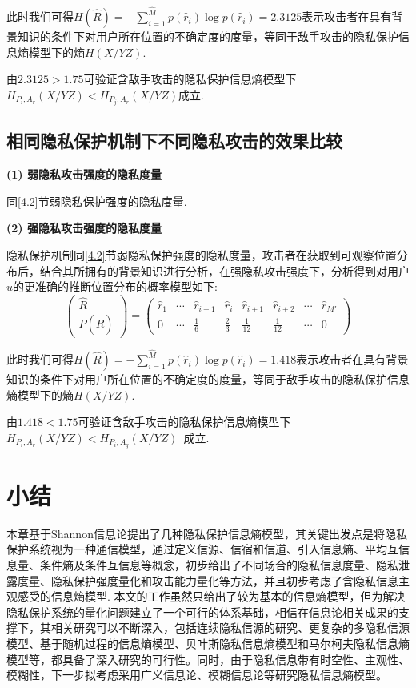 此时我们可得$H(\hat{R})=-\sum_{i=1}^{\hat{M}}p(\hat{r}_{i})\log p(\hat{r}_{i})=2.3125$表示攻击者在具有背景知识的条件下对用户所在位置的不确定度的度量，等同于敌手攻击的隐私保护信息熵模型下的熵$H(X/YZ)$.

由$2.3125>1.75$可验证含敌手攻击的隐私保护信息熵模型下$H_{P_{i},A_{r}}(X/YZ)<H_{P_{j},A_{r}}(X/YZ)$成立.

\subsection{相同隐私保护机制下不同隐私攻击的效果比较}

\textbf{(1) 弱隐私攻击强度的隐私度量}

同\ref{4.2}节弱隐私保护强度的隐私度量.

\textbf{(2) 强隐私攻击强度的隐私度量}

隐私保护机制同\ref{4.2}节弱隐私保护强度的隐私度量，攻击者在获取到可观察位置分布后，结合其所拥有的背景知识进行分析，在强隐私攻击强度下，分析得到对用户$u$的更准确的推断位置分布的概率模型如下:
\begin{equation*}
\begin{pmatrix}
\hat{R}\\ 
P(\hat{R})
\end{pmatrix}=\begin{pmatrix}
\hat{r}_{1} & \cdots & \hat{r}_{i-1}  & \hat{r}_{i} & \hat{r}_{i+1} & \hat{r}_{i+2} & \cdots  & \hat{r}_{{M}'}\\ 
0 & \cdots  & \frac{1}{6} & \frac{2}{3} & \frac{1}{12} & \frac{1}{12} & \cdots  & 0
\end{pmatrix}
\end{equation*}

此时我们可得$H(\hat{R})=-\sum_{i=1}^{\hat{M}}p(\hat{r}_{i})\log p(\hat{r}_{i})=1.418$表示攻击者在具有背景知识的条件下对用户所在位置的不确定度的度量，等同于敌手攻击的隐私保护信息熵模型下的熵$H(X/YZ)$.

由$1.418<1.75$可验证含敌手攻击的隐私保护信息熵模型下~$H_{P_{i},A_{r}}(X/YZ)<H_{P_{i},A_{q}}(X/YZ)$~成立.

\section{小结}\label{conclusion}
本章基于Shannon信息论提出了几种隐私保护信息熵模型，其关键出发点是将隐私保护系统视为一种通信模型，通过定义信源、信宿和信道、引入信息熵、平均互信息量、条件熵及条件互信息等概念，初步给出了不同场合的隐私信息度量、隐私泄露度量、隐私保护强度量化和攻击能力量化等方法，并且初步考虑了含隐私信息主观感受的信息熵模型. 本文的工作虽然只给出了较为基本的信息熵模型，但为解决隐私保护系统的量化问题建立了一个可行的体系基础，相信在信息论相关成果的支撑下，其相关研究可以不断深入，包括连续隐私信源的研究、更复杂的多隐私信源模型、基于随机过程的信息熵模型、贝叶斯隐私信息熵模型和马尔柯夫隐私信息熵模型等，都具备了深入研究的可行性。同时，由于隐私信息带有时空性、主观性、模糊性，下一步拟考虑采用广义信息论、模糊信息论等研究隐私信息熵模型。












